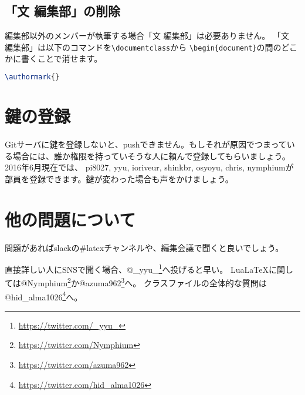 \documentclass[../../main]{subfiles}
\begin{document}
\subsection{「文 編集部」の削除}

編集部以外のメンバーが執筆する場合「文 編集部」は必要ありません。
「文　編集部」は以下のコマンドを\lstinline|\documentclass|から
\lstinline|\begin{document}|の間のどこかに書くことで消せます。

\begin{lstlisting}[language=TeX, mathescape]
\authormark{}    
\end{lstlisting}

\section{鍵の登録}

Gitサーバに鍵を登録しないと、pushできません。もしそれが原因でつまっている場合には、誰か権限を持っていそうな人に頼んで登録してもらいましょう。2016年6月現在では、
pi8027, yyu, ioriveur, shinkbr, osyoyu, chris, nymphiumが部員を登録できます。鍵が変わった場合も声をかけましょう。

\section{他の問題について}

問題があればslackの\#latexチャンネルや、編集会議で聞くと良いでしょう。

直接詳しい人にSNSで聞く場合、@\_yyu\_\footnote{\url{https://twitter.com/_yyu_}}へ投げると早い。
Lua\LaTeX に関しては@Nymphium\footnote{\url{https://twitter.com/Nymphium}}か@azuma962\footnote{\url{https://twitter.com/azuma962}}へ。
クラスファイルの全体的な質問は@hid\_alma1026\footnote{\url{https://twitter.com/hid_alma1026}}へ。
\end{document}
